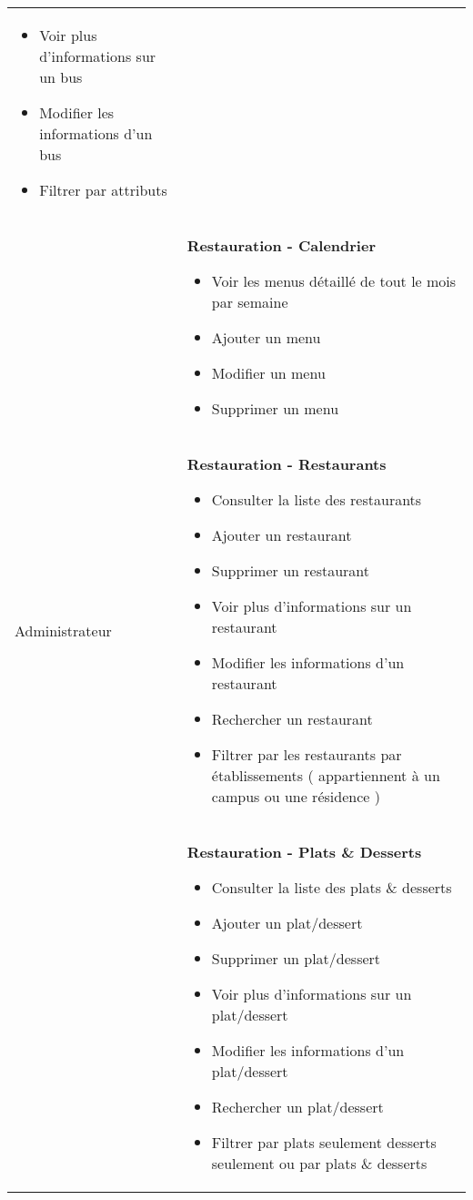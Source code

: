 \begin{longtable}{|Z{3cm}|L{10cm}|}
\begin{itemize}
        \item Voir plus d'informations sur un bus
        \item Modifier les informations d'un bus
        \item Filtrer par attributs
    \end{itemize}\\
    &
    \textbf{Restauration - Calendrier}
    \begin{itemize}
        \item Voir les menus détaillé de tout le mois par semaine
        \item Ajouter un menu
        \item Modifier un menu
        \item Supprimer un menu
    \end{itemize}\\
    Administrateur &
    \textbf{Restauration - Restaurants}
    \begin{itemize}
        \item Consulter la liste des restaurants
        \item Ajouter un restaurant
        \item Supprimer un restaurant
        \item Voir plus d'informations sur un restaurant
        \item Modifier les informations d'un restaurant
        \item Rechercher un restaurant
        \item Filtrer par les restaurants par établissements ( appartiennent à un campus ou une résidence )
    \end{itemize}\\
    &
    \textbf{Restauration - Plats \& Desserts}
    \begin{itemize}
        \item Consulter la liste des plats \& desserts
        \item Ajouter un plat/dessert
        \item Supprimer un plat/dessert
        \item Voir plus d'informations sur un plat/dessert
        \item Modifier les informations d'un plat/dessert
        \item Rechercher un plat/dessert
        \item Filtrer par plats seulement desserts seulement ou par plats \& desserts
    \end{itemize}\\

\end{longtable}
